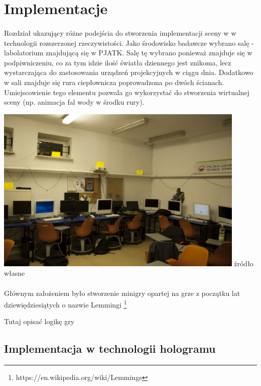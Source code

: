 \newpage
\section{Implementacje}
\paragraph{}
Rozdział ukazujący różne podejścia do stworzenia implementacji sceny w w technologii rozszerzonej rzeczywistości.
Jako środowisko badawcze wybrano salę - labolatorium znajdującą się w PJATK. Salę tę wybrano ponieważ znajduje się w podpiwniczeniu, co za tym idzie ilość światła dziennego jest znikoma, lecz wystarczająca do zastosowania urządzeń projekcyjnych w ciągu dnia. Dodatkowo w sali znajduje się rura ciepłownicza poprowadzona po dwóch ścianach. Umiejscowienie tego elementu pozwala go wykorzystać do stworzenia wirtualnej sceny (np. animacja fal wody w środku rury).

\begin{center}
\includegraphics[width=0.9\textwidth]{images/s9.jpg}
\small {źródło własne }
\end{center}

\paragraph{}
Głównym założeniem było stworzenie minigry opartej na grze z początku lat dziewiędziesiątych o nazwie Lemmingi \footnote{https://en.wikipedia.org/wiki/Lemmings}

{\color{red}Tutaj opisać logikę gry}

\subsection{Implementacja w technologii hologramu}
